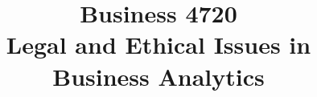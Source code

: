 \documentclass{article}
\title{Business 4720\\ \vspace{\baselineskip}
Legal and Ethical Issues in Business Analytics}
\begin{document}
\maketitle

\vfill

\clearpage


\end{document}
